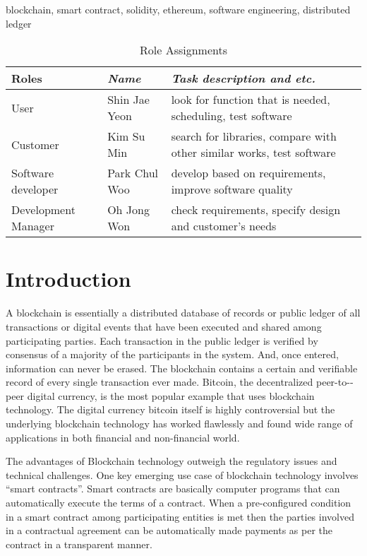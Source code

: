 \documentclass[conference]{IEEEtran}
\begin{document}
\begin{IEEEkeywords}
blockchain, smart contract,  solidity, ethereum, software engineering, distributed ledger
\end{IEEEkeywords}

  \begin{table}[htbp]
  \renewcommand{\arraystretch}{1.5}
\caption{Role Assignments}
\begin{center}
\begin{tabular}{|p{2cm}|p{2cm}|p{3.5cm}|}
\hline
\textbf{Roles} & \textbf{\textit{Name}}& \textbf{\textit{Task description and etc.}} \\
\hline
User & Shin Jae Yeon &look for function that is needed, scheduling, test software\\
\hline
Customer & Kim Su Min & search for libraries, compare with other similar works, test software\\
\hline
Software developer& Park Chul Woo & develop based on requirements, improve software quality \\
\hline
Development Manager & Oh Jong Won & check requirements, specify design and customer's needs\\
\hline
\end{tabular}
\label{tab1}
\end{center}
\end{table}

\section{Introduction}
A blockchain is essentially a distributed database of records or public ledger of all transactions or
digital events that have been executed and shared among participating parties. Each transaction in
the public ledger is verified by consensus of a majority of the participants in the system. And, once
entered, information can never be erased. The blockchain contains a certain and verifiable record of
every single transaction ever made. Bitcoin, the decentralized peer­-to-­peer digital currency, is the
most popular example that uses blockchain technology. The digital currency bitcoin itself is highly
controversial but the underlying blockchain technology has worked flawlessly and found wide range of
applications in both financial and non-­financial world.

The advantages of Blockchain technology outweigh the regulatory issues and technical challenges. One
key emerging use case of blockchain technology involves “smart contracts”. Smart contracts are
basically computer programs that can automatically execute the terms of a contract. When a
pre-configured condition in a smart contract among participating entities is met then the parties
involved in a contractual agreement can be automatically made payments as per the contract in a
transparent manner.
\end{document}
